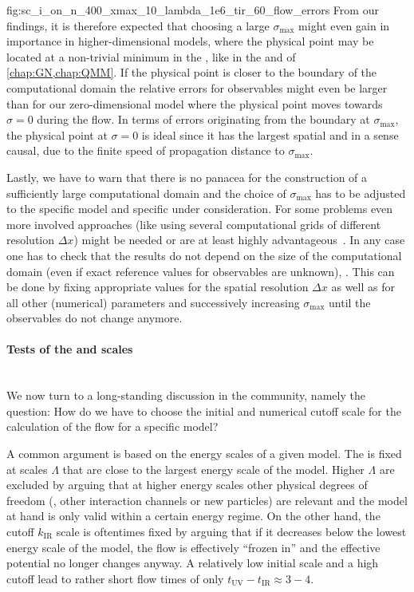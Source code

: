 	{fig:sc_i_on_n_400_xmax_10_lambda_1e6_tir_60_flow_errors} %
From our findings, it is therefore expected that choosing a large $\sigma_\mathrm{max}$ might even gain in importance in higher-dimensional models, where the physical point may be located at a non-trivial minimum in the \ir{}, like in the \qm{} and \gnyBm{} of \cref{chap:GN,chap:QMM}. 
If the physical point is closer to the boundary of the computational domain the relative errors for observables might even be larger than for our zero-dimensional model where the physical point moves towards $\sigma = 0$ during the \frg{} flow. 
In terms of errors originating from the boundary at $\sigma_\mathrm{max}$, the physical point at $\sigma = 0$ is ideal since it has the largest spatial and \dash{} in a sense causal, due to the finite speed of propagation \dash{} distance to $\sigma_\mathrm{max}$.

Lastly, we have to warn that there is no panacea for the construction of a sufficiently large computational domain and the choice of $\sigma_\mathrm{max}$ has to be adjusted to the specific model and specific \ic{} under consideration. 
For some problems even more involved approaches (like using several computational grids of different resolution $\Delta x$) might be needed or are at least highly advantageous~\cite{Grossi:2019urj,Grossi:2021ksl,Ihssen:2022xkr,Ihssen:2023xlp}.
In any case one has to check that the \ir{} results do not depend on the size of the computational domain (even if exact reference values for observables are unknown), \cf{} .
This can be done by fixing appropriate values for the spatial resolution $\Delta x$ as well as for all other (numerical) parameters and successively increasing $\sigma_\mathrm{max}$ until the \ir{} observables do not change anymore.

\paragraph{Tests of the \uv{} and \ir{} scales}\label{paragraph:ONRGconsistency}\mbox{}\\%
We now turn to a long-standing discussion in the \frg{} community, namely the question: How do we have to choose the initial \uv{} and numerical \ir{} cutoff scale for the calculation of the 
\frg{} flow for a specific model? 

A common argument is based on the energy scales of a given model. The \uv{} \ic{} is fixed at \uv{} scales $\Lambda$ that are close to the largest energy scale of the model.
Higher $\Lambda$ are excluded by arguing that at higher energy scales other physical degrees of freedom (\eg{}, other interaction channels or new particles) are relevant and the model at hand is only valid within a certain energy regime.
On the other hand, the \ir{} cutoff $k_\mathrm{IR}$ scale is oftentimes fixed by arguing that if it decreases below the lowest energy scale of the model, the \frg{} flow is effectively ``frozen in'' and the effective potential no longer changes anyway.
A relatively low \uv{} initial scale and a high \ir{} cutoff lead to rather short flow times of only $t_\mathrm{UV} - t_\mathrm{IR} \approx 3 - 4$.

